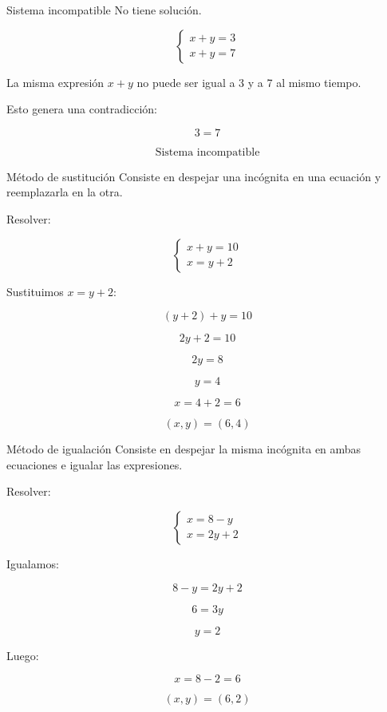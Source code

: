 \documentclass[aspectratio=169]{beamer}
\begin{document}
	\begin{frame}{Sistema incompatible}
		No tiene solución.
		
		\[
		\begin{cases}
			x+y=3\\
			x+y=7
		\end{cases}
		\]
		
		\bigskip
		
		La misma expresión \(x+y\) no puede ser igual a 3 y a 7 al mismo tiempo.
		
		\bigskip
		
		Esto genera una contradicción:
		
		\[
		3=7
		\]
		
		\[
		\boxed{\text{Sistema incompatible}}
		\]
	\end{frame}
	
	\begin{frame}{Método de sustitución}
		Consiste en despejar una incógnita en una ecuación y reemplazarla en la otra.
		
		\bigskip
		
		Resolver:
		
		\[
		\begin{cases}
			x+y=10\\
			x=y+2
		\end{cases}
		\]
		
		Sustituimos \(x=y+2\):
		
		\[
		(y+2)+y=10
		\]
		
		\[
		2y+2=10
		\]
		
		\[
		2y=8
		\]
		
		\[
		y=4
		\]
		
		\[
		x=4+2=6
		\]
		
		\[
		\boxed{(x,y)=(6,4)}
		\]
	\end{frame}
	
	\begin{frame}{Método de igualación}
		Consiste en despejar la misma incógnita en ambas ecuaciones e igualar las expresiones.
		
		\bigskip
		
		Resolver:
		
		\[
		\begin{cases}
			x=8-y\\
			x=2y+2
		\end{cases}
		\]
		
		Igualamos:
		
		\[
		8-y=2y+2
		\]
		
		\[
		6=3y
		\]
		
		\[
		y=2
		\]
		
		Luego:
		
		\[
		x=8-2=6
		\]
		
		\[
		\boxed{(x,y)=(6,2)}
		\]
	\end{frame}
	
\end{document}

